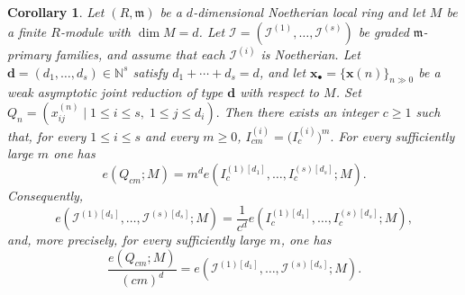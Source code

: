 \documentclass[reqno,12pt]{amsart}
\theoremstyle{plain}
\newtheorem{cor}[prop]{Corollary}
\theoremstyle{definition}
\theoremstyle{remark}
\numberwithin{equation}{section}
\begin{document}
\begin{cor}
\label{cor:weak-rees-noetherian}
Let $(R,\mathfrak m)$ be a $d$-dimensional Noetherian local ring and let
$M$ be a finite $R$-module with $\dim M=d$. Let $\boldsymbol{\mathcal I}
=
(\mathcal I^{(1)},\ldots,\mathcal I^{(s)})$
be graded $\mathfrak m$-primary families, and assume that each
$\mathcal I^{(i)}$ is Noetherian.
Let $\mathbf d=(d_1,\ldots,d_s)\in\mathbb N^s$ satisfy
$d_1+\cdots+d_s=d$, and let
$\mathbf x_\bullet=\{\mathbf x(n)\}_{n\gg0}$ be a weak asymptotic joint
reduction of type $\mathbf d$ with respect to $M$. Set $Q_n
=
(x_{ij}^{(n)}
\mid
1\leq i\leq s,\;
1\leq j\leq d_i).$
Then there exists an integer $c\geq1$ such that, for every
$1\leq i\leq s$ and every $m\geq0$, $I_{cm}^{(i)}
=
\bigl(I_c^{(i)}\bigr)^m.$
For every sufficiently large $m$ one has
\[
e(Q_{cm};M)
=
m^d
e\!\left(
I_c^{(1)[d_1]},\ldots,
I_c^{(s)[d_s]};M
\right).
\]
Consequently,
\[
e\!\left(
\mathcal I^{(1)[d_1]},\ldots,
\mathcal I^{(s)[d_s]};M
\right)
=
\frac{1}{c^d}
e\!\left(
I_c^{(1)[d_1]},\ldots,
I_c^{(s)[d_s]};M
\right),
\]
and, more precisely, for every sufficiently large $m$, one has
\[
\frac{e(Q_{cm};M)}{(cm)^d}
=
e\!\left(
\mathcal I^{(1)[d_1]},\ldots,
\mathcal I^{(s)[d_s]};M
\right).
\]

\end{cor}
\end{document}
